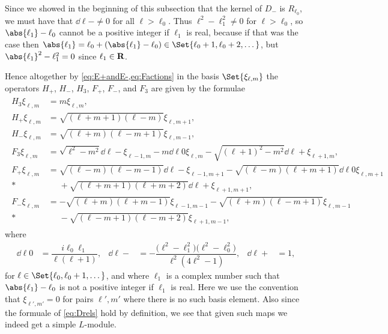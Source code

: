 Since we showed in the beginning of this subsection that the kernel of $D_-$ is $R_{\ell_0}$, we must have that $\dd{\ell}{-}\neq 0$ for all $\ell>\ell_0$. Thus $\ell^2-\ell_1^2\neq 0$ for $\ell>\ell_0$, so $\abs{\ell_1}-\ell_0$ cannot be a positive integer if $\ell_1$ is real, because if that was the case then $\abs{\ell_1}= \ell_0+(\abs{\ell_1}-\ell_0) \in \Set{\ell_0+1,\ell_0+2,\dotsc}$, but $\abs{\ell_1}^2-\ell_1^2=0$ since $\ell_1\in\mathbf{R}$.

Hence altogether by \cref{eq:E+andE-,eq:Factions} in the basis $\Set{\xi_{\ell,m}}$ the operators $H_+$, $H_-$, $H_3$, $F_+$, $F_-$, and $F_3$ are given by the formulae
\begin{align}\label{eq:infdimactions}
  \begin{aligned}
    H_3\xi_{\ell,m} &= m\xi_{\ell,m}, \\
    H_+\xi_{\ell,m} &= \sqrt{(\ell+m+1)(\ell-m)} \xi_{\ell,m+1}, \\
    H_-\xi_{\ell,m} &= \sqrt{(\ell+m)(\ell-m+1)} \xi_{\ell,m-1}, \\
    F_3\xi_{\ell,m} &= \sqrt{\ell^2-m^2} \dd{\ell}{-}\xi_{\ell-1,m} - m \dd{\ell}{0}\xi_{\ell,m} - \sqrt{(\ell+1)^2-m^2}\dd{\ell}{+}\xi_{\ell+1,m}, \\
    F_+\xi_{\ell,m} &= \sqrt{(\ell-m)(\ell-m-1)}\dd{\ell}{-}\xi_{\ell-1,m+1} - \sqrt{(\ell-m)(\ell+m+1)}\dd{\ell}{0}\xi_{\ell,m+1} \\*
    &\phantom{{}={}}{} + \sqrt{(\ell+m+1)(\ell+m+2)} \dd{\ell}{+}\xi_{\ell+1,m+1}, \\
    F_-\xi_{\ell,m} &= -\sqrt{(\ell+m)(\ell+m-1)}\xi_{\ell-1,m-1} - \sqrt{(\ell+m)(\ell-m+1)}\xi_{\ell,m-1} \\*
    &\phantom{{}={}}{} - \sqrt{(\ell-m+1)(\ell-m+2)}\xi_{\ell+1,m-1},
  \end{aligned}
\end{align}
where
\begin{align}\label{eq:infdimds}
  \dd{\ell}{0} &= \dfrac{i\ell_0\ell_1}{\ell(\ell+1)}, & \dd{\ell}{-} &= -\dfrac{\bigl(\ell^2 - \ell_1^2\bigr)\bigl( \ell^2 - \ell_0^2 \bigr)}{\ell^2(4\ell^2-1)}, & \dd{\ell}{+} &= 1,
\end{align}
for $\ell\in\Set{\ell_0,\ell_0+1,\dotsc}$, and where $\ell_1$ is a complex number such that $\abs{\ell_1}-\ell_0$ is not a positive integer if $\ell_1$ is real. Here we use the convention that $\xi_{\ell',m'}=0$ for pairs $\ell',m'$ where there is no such basis element. Also since the formuale of \cref{eq:Drels} hold by definition, we see that given such maps we indeed get a simple $L$-module.

